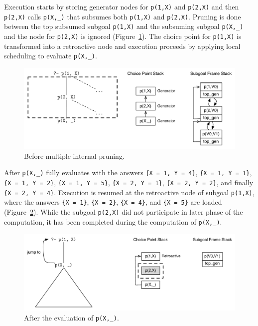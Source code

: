 Execution starts by storing generator nodes for \texttt{p(1,X)} and \texttt{p(2,X)} and then
\texttt{p(2,X)} calls \texttt{p(X,\_)} that subsumes both \texttt{p(1,X)} and \texttt{p(2,X)}.
Pruning is done between the top subsumed subgoal \texttt{p(1,X)} and the subsuming subgoal
\texttt{p(X,\_)} and the node for \texttt{p(2,X)} is ignored (Figure~\ref{fig:retro_multiple_internal1}).
The choice point for \texttt{p(1,X)} is transformed into a retroactive node and execution proceeds by
applying local scheduling to evaluate \texttt{p(X,\_)}.

\begin{figure}[ht]
  \centering
    \includegraphics[scale=0.6]{retro_multiple_internal1.pdf}
  \caption{Before multiple internal pruning.}
  \label{fig:retro_multiple_internal1}
\end{figure}

After \texttt{p(X,\_)} fully evaluates with the answers
\texttt{\{X~=~1,~Y~=~4\}},
\texttt{\{X~=~1,~Y~=~1\}},
\texttt{\{X~=~1,~Y~=~2\}},
\texttt{\{X~=~1,~Y~=~5\}},
\texttt{\{X~=~2,~Y~=~1\}},
\texttt{\{X~=~2,~Y~=~2\}},
and finally \texttt{\{X~=~2,~Y~=~4\}}.
Execution is resumed at the retroactive node of
subgoal \texttt{p(1,X)}, where the answers
\texttt{\{X~=~1\}},
\texttt{\{X~=~2\}},
\texttt{\{X~=~4\}},
and \texttt{\{X~=~5\}}
are loaded
(Figure~\ref{fig:retro_multiple_internal2}).
While the subgoal \texttt{p(2,X)} did not participate in later phase of the computation, it has been completed
during the computation of \texttt{p(X,\_)}. 

\begin{figure}[ht]
  \centering
    \includegraphics[scale=0.6]{retro_multiple_internal2.pdf}
  \caption{After the evaluation of \texttt{p(X,\_)}.}
  \label{fig:retro_multiple_internal2}
\end{figure}


